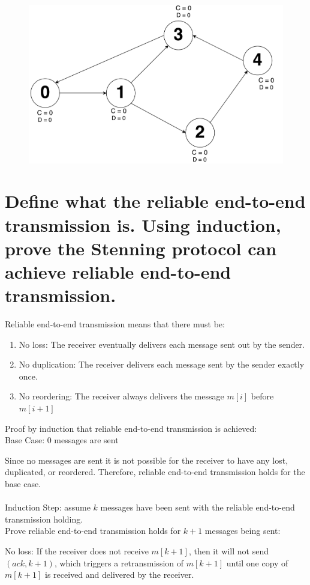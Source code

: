 \documentclass[times]{article}
\begin{document}
		\begin{figure}[H]
			\includegraphics[width=\linewidth]{q2/10.pdf}
		\end{figure}
	\pagebreak
	\section{Define what the reliable end-to-end transmission is. Using induction, prove the Stenning protocol can achieve reliable end-to-end transmission.}
		Reliable end-to-end transmission means that there must be:
		\begin{enumerate}
			\item No loss: The receiver eventually delivers each message sent out by the sender.
			\item No duplication: The receiver delivers each message sent by the sender exactly once.
			\item No reordering: The receiver always delivers the message $m[i]$ before $m[i+1]$
		\end{enumerate}
		Proof by induction that reliable end-to-end transmission is achieved:\\
		Base Case: 0 messages are sent
		
		Since no messages are sent it is not possible for the receiver to have any lost, duplicated, or reordered. Therefore, reliable end-to-end transmission holds for the base case.\\\\
		Induction Step: assume $k$ messages have been sent with the reliable end-to-end transmission holding.\\		
		Prove reliable end-to-end transmission holds for $k+1$ messages being sent:
		
		No loss: If the receiver does not receive $m[k+1]$, then it will not send $(ack, k+1)$, which triggers a retransmission of $m[k+1]$ until one copy of $m[k+1]$ is received and delivered by the receiver.
		
\end{document}

